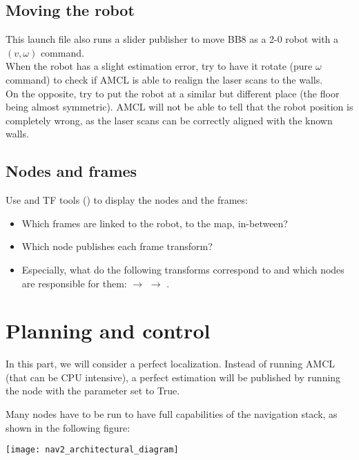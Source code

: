 \documentclass{ecnreport}
\begin{document}
\subsection{Moving the robot}

This launch file also runs a slider publisher to move BB8 as a 2-0 robot with a $(v,\omega)$ command.\\
When the robot has a slight estimation error, try to have it rotate (pure $\omega$ command) to check if AMCL is able to realign the laser scans to the walls. \\
On the opposite, try to put the robot at a similar but different place (the floor being almost symmetric).
AMCL will not be able to tell that the robot position is completely wrong, as the laser scans can be correctly aligned with the known walls.

\subsection{Nodes and frames}

Use  and TF tools () to display the nodes and the frames:
\begin{itemize}
 \item Which frames are linked to the robot, to the map, in-between?
 \item Which node publishes each frame transform?
 \item Especially, what do the following transforms correspond to and which nodes are responsible for them:
  $\rightarrow$  $\rightarrow$ .
\end{itemize}

\section{Planning and control}

In this part, we will consider a perfect localization. Instead of running AMCL (that can be CPU intensive), a perfect estimation 
will be published by running the  node with the parameter  set to True.

Many nodes have to be run to have full capabilities of the navigation stack, as shown in the following figure:
\begin{center}
 \texttt{[image: nav2\_architectural\_diagram]}
\end{center}
\end{document}
